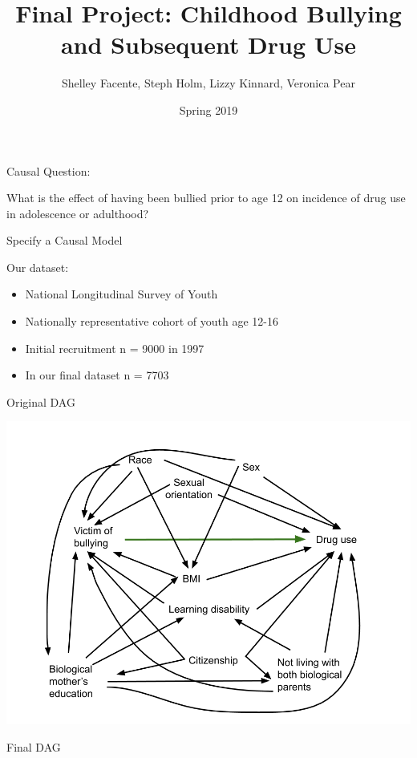 \documentclass[ignorenonframetext,]{beamer}
\title{Final Project: Childhood Bullying and Subsequent Drug Use}
\author{Shelley Facente, Steph Holm, Lizzy Kinnard, Veronica Pear}
\date{Spring 2019}
\providecommand{\tightlist}{%
  \setlength{\itemsep}{0pt}\setlength{\parskip}{0pt}}
\begin{document}
\frame{\titlepage}

\begin{frame}{Causal Question:}

What is the effect of having been bullied prior to age 12 on incidence
of drug use in adolescence or adulthood?

\begin{block}{Specify a Causal Model}

Our dataset:

\begin{itemize}
\tightlist
\item
  National Longitudinal Survey of Youth
\item
  Nationally representative cohort of youth age 12-16
\item
  Initial recruitment n = 9000 in 1997
\item
  In our final dataset n = 7703
\end{itemize}

\end{block}

\begin{block}{Original DAG}

\includegraphics[width=1\linewidth]{DAG Causal Final Project_all covariates}

\end{block}

\begin{block}{Final DAG}


\end{block}
\end{frame}
\end{document}
